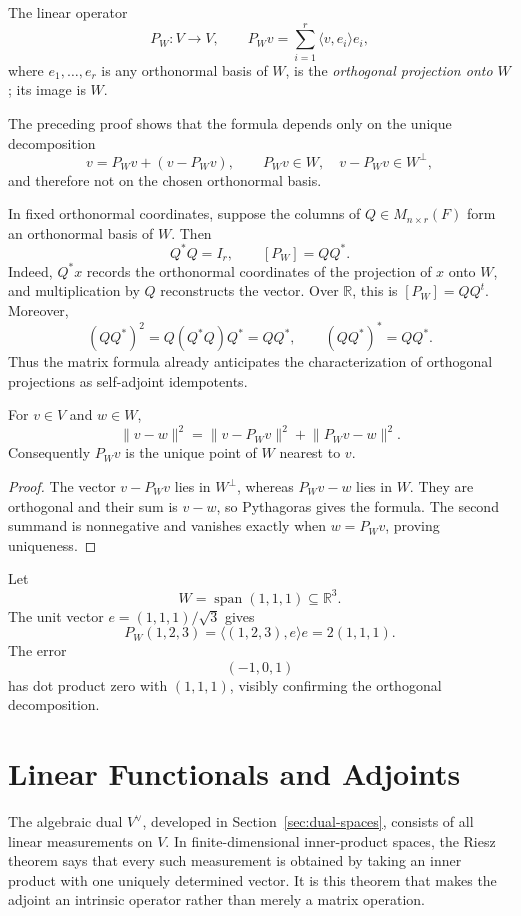 \begin{definition}
The linear operator
\[
P_W:V\longrightarrow V,
\qquad
P_Wv=\sum_{i=1}^r\langle v,e_i\rangle e_i,
\]
where \(e_1,\ldots,e_r\) is any orthonormal basis of \(W\), is the
\emph{orthogonal projection onto \(W\)}; its image is \(W\).
\end{definition}

The preceding proof shows that the formula depends only on the unique
decomposition
\[
v=P_Wv+(v-P_Wv),
\qquad
P_Wv\in W,
\quad v-P_Wv\in W^\perp,
\]
and therefore not on the chosen orthonormal basis.

In fixed orthonormal coordinates, suppose the columns of
\(Q\in M_{n\times r}(F)\) form an orthonormal basis of \(W\). Then
\[
Q^*Q=I_r,\qquad [P_W]=QQ^*.
\]
Indeed, \(Q^*x\) records the orthonormal coordinates of the projection of
\(x\) onto \(W\), and multiplication by \(Q\) reconstructs the vector. Over
\(\mathbb R\), this is \([P_W]=QQ^t\). Moreover,
\[
(QQ^*)^2=Q(Q^*Q)Q^*=QQ^*,\qquad (QQ^*)^*=QQ^*.
\]
Thus the matrix formula already anticipates the characterization of
orthogonal projections as self-adjoint idempotents.

\begin{theorem}
For \(v\in V\) and \(w\in W\),
\[
\lVert v-w\rVert^2
=\lVert v-P_Wv\rVert^2+\lVert P_Wv-w\rVert^2.
\]
Consequently \(P_Wv\) is the unique point of \(W\) nearest to \(v\).
\end{theorem}
\begin{proof}
The vector \(v-P_Wv\) lies in \(W^\perp\), whereas \(P_Wv-w\) lies in
\(W\). They are orthogonal and their sum is \(v-w\), so Pythagoras gives the
formula. The second summand is nonnegative and vanishes exactly when
\(w=P_Wv\), proving uniqueness.
\end{proof}

\begin{example}
Let
\[
W=\operatorname{span}(1,1,1)\subseteq\mathbb R^3.
\]
The unit vector \(e=(1,1,1)/\sqrt3\) gives
\[
P_W(1,2,3)=\langle(1,2,3),e\rangle e=2(1,1,1).
\]
The error
\[
(-1,0,1)
\]
has dot product zero with \((1,1,1)\), visibly confirming the orthogonal
decomposition.
\end{example}

\section{Linear Functionals and Adjoints}

The algebraic dual \(V^\vee\), developed in
Section~\ref{sec:dual-spaces}, consists of all
linear measurements on \(V\). In finite-dimensional inner-product spaces,
the Riesz theorem says that every such measurement is obtained by taking an
inner product with one uniquely determined vector. It is this theorem that
makes the adjoint an intrinsic operator rather than merely a matrix operation.

